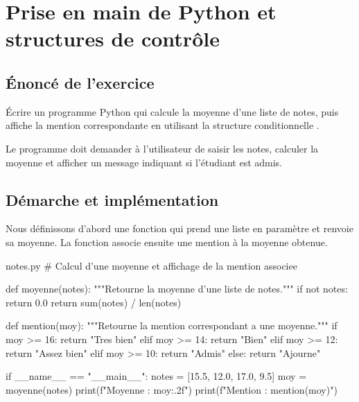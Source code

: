 \chapter{Prise en main de Python et structures de contrôle}

\section{Énoncé de l'exercice}

\begin{remarque}[Consigne]
Écrire un programme Python qui calcule la moyenne d'une liste de notes, puis
affiche la mention correspondante en utilisant la structure conditionnelle
.
\end{remarque}

Le programme doit demander à l'utilisateur de saisir les notes, calculer la
moyenne et afficher un message indiquant si l'étudiant est admis.

\section{Démarche et implémentation}

Nous définissons d'abord une fonction  qui prend une liste
en paramètre et renvoie sa moyenne. La fonction  associe
ensuite une mention à la moyenne obtenue.

\begin{code}[language=Python]{notes.py}
# Calcul d'une moyenne et affichage de la mention associee

def moyenne(notes):
    """Retourne la moyenne d'une liste de notes."""
    if not notes:
        return 0.0
    return sum(notes) / len(notes)


def mention(moy):
    """Retourne la mention correspondant a une moyenne."""
    if moy >= 16:
        return "Tres bien"
    elif moy >= 14:
        return "Bien"
    elif moy >= 12:
        return "Assez bien"
    elif moy >= 10:
        return "Admis"
    else:
        return "Ajourne"


if __name__ == "__main__":
    notes = [15.5, 12.0, 17.0, 9.5]
    moy = moyenne(notes)
    print(f"Moyenne : {moy:.2f}")
    print(f"Mention : {mention(moy)}")
\end{code}

